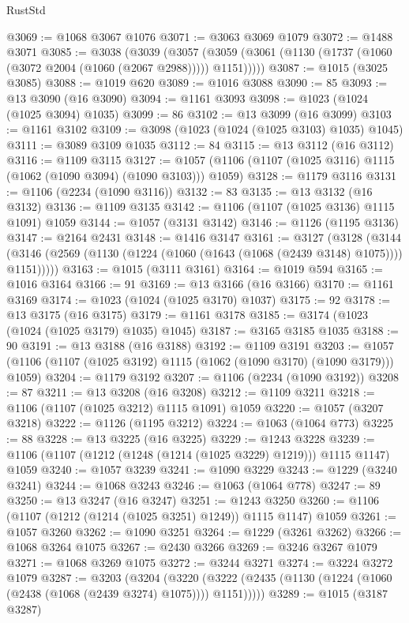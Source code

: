 \begin{lexlean}{RustStd}
\begin{coremodule}
@3069 := @1068 @3067 @1076
@3071 := @3063 @3069 @1079
@3072 := @1488 @3071
@3085 := @3038
    (@3039
      (@3057 (@3059 (@3061 (@1130 (@1737 (@1060 (@3072 @2004 (@1060 (@2067 @2988))))) @1151)))))
@3087 := @1015 (@3025 @3085)
@3088 := @1019 @620
@3089 := @1016 @3088
@3090 := 85
@3093 := @13 @3090 (@16 @3090)
@3094 := @1161 @3093
@3098 := @1023 (@1024 (@1025 @3094) @1035)
@3099 := 86
@3102 := @13 @3099 (@16 @3099)
@3103 := @1161 @3102
@3109 := @3098 (@1023 (@1024 (@1025 @3103) @1035) @1045)
@3111 := @3089 @3109 @1035
@3112 := 84
@3115 := @13 @3112 (@16 @3112)
@3116 := @1109 @3115
@3127 := @1057 (@1106 (@1107 (@1025 @3116) @1115 (@1062 (@1090 @3094) (@1090 @3103))) @1059)
@3128 := @1179 @3116
@3131 := @1106 (@2234 (@1090 @3116))
@3132 := 83
@3135 := @13 @3132 (@16 @3132)
@3136 := @1109 @3135
@3142 := @1106 (@1107 (@1025 @3136) @1115 @1091) @1059
@3144 := @1057 (@3131 @3142)
@3146 := @1126 (@1195 @3136)
@3147 := @2164 @2431
@3148 := @1416 @3147
@3161 := @3127
    (@3128
      (@3144 (@3146 (@2569 (@1130 (@1224 (@1060 (@1643 (@1068 (@2439 @3148) @1075)))) @1151)))))
@3163 := @1015 (@3111 @3161)
@3164 := @1019 @594
@3165 := @1016 @3164
@3166 := 91
@3169 := @13 @3166 (@16 @3166)
@3170 := @1161 @3169
@3174 := @1023 (@1024 (@1025 @3170) @1037)
@3175 := 92
@3178 := @13 @3175 (@16 @3175)
@3179 := @1161 @3178
@3185 := @3174 (@1023 (@1024 (@1025 @3179) @1035) @1045)
@3187 := @3165 @3185 @1035
@3188 := 90
@3191 := @13 @3188 (@16 @3188)
@3192 := @1109 @3191
@3203 := @1057 (@1106 (@1107 (@1025 @3192) @1115 (@1062 (@1090 @3170) (@1090 @3179))) @1059)
@3204 := @1179 @3192
@3207 := @1106 (@2234 (@1090 @3192))
@3208 := 87
@3211 := @13 @3208 (@16 @3208)
@3212 := @1109 @3211
@3218 := @1106 (@1107 (@1025 @3212) @1115 @1091) @1059
@3220 := @1057 (@3207 @3218)
@3222 := @1126 (@1195 @3212)
@3224 := @1063 (@1064 @773)
@3225 := 88
@3228 := @13 @3225 (@16 @3225)
@3229 := @1243 @3228
@3239 := @1106 (@1107 (@1212 (@1248 (@1214 (@1025 @3229) @1219))) @1115 @1147) @1059
@3240 := @1057 @3239
@3241 := @1090 @3229
@3243 := @1229 (@3240 @3241)
@3244 := @1068 @3243
@3246 := @1063 (@1064 @778)
@3247 := 89
@3250 := @13 @3247 (@16 @3247)
@3251 := @1243 @3250
@3260 := @1106 (@1107 (@1212 (@1214 (@1025 @3251) @1249)) @1115 @1147) @1059
@3261 := @1057 @3260
@3262 := @1090 @3251
@3264 := @1229 (@3261 @3262)
@3266 := @1068 @3264 @1075
@3267 := @2430 @3266
@3269 := @3246 @3267 @1079
@3271 := @1068 @3269 @1075
@3272 := @3244 @3271
@3274 := @3224 @3272 @1079
@3287 := @3203
    (@3204
      (@3220 (@3222 (@2435 (@1130 (@1224 (@1060 (@2438 (@1068 (@2439 @3274) @1075)))) @1151)))))
@3289 := @1015 (@3187 @3287)

\end{coremodule}
\end{lexlean}
